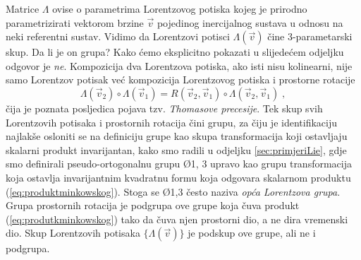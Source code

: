 Matrice $\Lambda$ ovise o parametrima Lorentzovog
potiska kojeg je prirodno parametrizirati vektorom brzine $\vec{v}$ pojedinog
inercijalnog sustava u odnosu na neki referentni sustav.
 Vidimo da Lorentzovi potisci $\Lambda(\vec{v})$ čine 3-parametarski
skup. Da li je on grupa? Kako ćemo eksplicitno pokazati u slijedećem
odjeljku odgovor je \emph{ne}. Kompozicija dva Lorentzova potiska, ako
isti nisu kolinearni, nije
samo Lorentzov potisak već kompozicija
Lorentzovog potiska i prostorne rotacije
\begin{equation}
 \Lambda(\vec{v}_2) \circ \Lambda(\vec{v}_1)
  = R(\vec{v}_2,\vec{v}_1) \circ \Lambda(\vec{v}_2,\vec{v}_1) \;,
\end{equation}
čija je  poznata posljedica pojava tzv. \emph{Thomasove precesije}. 
Tek skup svih Lorentzovih potisaka
i prostornih rotacija čini grupu, za čiju je identifikaciju najlakše
osloniti se na definiciju grupe kao skupa transformacija koji
ostavljaju skalarni produkt invarijantan, kako smo radili
u odjeljku \ref{sec:primjeriLie}, gdje smo definirali
pseudo-ortogonalnu grupu \O{1, 3} upravo kao grupu transformacija
koja ostavlja invarijantnim kvadratnu formu koja
odgovara skalarnom produktu (\ref{eq:produktminkowskog}).
Stoga se \O{1,3} često naziva \emph{opća Lorentzova grupa}.
Grupa prostornih rotacija 
je podgrupa ove grupe koja čuva produkt (\ref{eq:produtkminkowskog}) tako
da čuva njen prostorni dio, a ne dira vremenski dio. Skup Lorentzovih
potisaka $\{\Lambda(\vec{v})\}$ je podskup ove grupe, ali ne i podgrupa.

